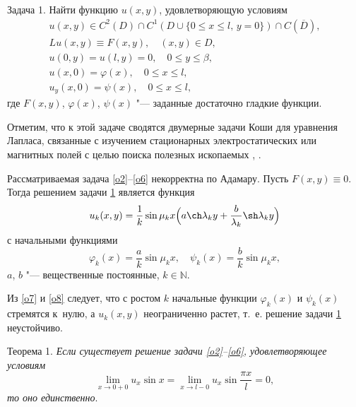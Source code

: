 \smallskip

\hypertarget{sab:task1}{}

{\small\sc Задача 1.} Найти функцию $u(x,y)$, удовлетворяющую условиям
\begin{gather}
\label{o2}
u(x,y)\in C^{2}(D)\cap C^{1}(D\cup\{0\leq x\leq l, \,y=0\})\cap C(\overline{D}),
\\
\label{o3}
Lu(x,y)\equiv F(x,y), \quad  (x,y)\in D,
\\ 
 \label{o4}
u(0,y)=u(l,y)=0, \quad  0\leq y\leq \beta,
\\
\label{o5}
u(x,0)=\varphi(x), \quad  0\leq x\leq l,
\\
\label{o6}
u_y(x,0)=\psi(x), \quad  0\leq x\leq l,
\end{gather}
где $F(x,y)$, $\varphi(x)$, $\psi(x)$ "--- заданные достаточно гладкие функции.

\smallskip

Отметим, что к этой задаче сводятся двумерные задачи Коши для уравнения Лапласа, связанные с изучением стационарных электростатических или магнитных полей с целью поиска полезных ископаемых \cite[с.~131]{sab:13}, \cite[с.~254]{sab:16}.

Рассматриваемая задача \eqref{o2}--\eqref{o6} некорректна по Адамару. 
Пусть ${F(x,y){\equiv}0}$. 
Тогда решением задачи \hyperlink{sab:task1}{1} является функция
\begin{equation}\label{o7}
u_k(x,y)=\frac{1}{k}\sin\mu_kx \Bigl(a\ch\lambda_ky+\frac{b}{\lambda_k}\sh\lambda_ky\Bigr)
\end{equation}
с начальными функциями
\begin{equation}\label{o8}
\varphi_k(x)=\frac{a}{k}\sin\mu_kx,\quad  
\psi_k(x)=\frac{b}{k}\sin\mu_kx,
\end{equation}
$a$, $b$ "--- вещественные постоянные, $k\in\mathbb{N}$.

Из \eqref{o7} и \eqref{o8} следует, что с ростом $k$ начальные функции $\varphi_k(x)$ и $\psi_k(x)$ стремятся к~нулю, а $u_k(x,y)$ неограниченно растет, т.~е. решение задачи \hyperlink{sab:task1}{1} неустойчиво.

\smallskip

\hypertarget{sab:th1}{}

{\small\sc Теорема 1.} \textit{Если существует решение задачи {\em \eqref{o2}--\eqref{o6},} удовлетворяющее условиям
\begin{equation}
\label{o9}
\lim_{x\rightarrow0+0}u_x\sin x=\lim_{x\rightarrow l-0}u_x\sin\frac{\pi x}{l}=0,
\end{equation}
то оно единственно}.


